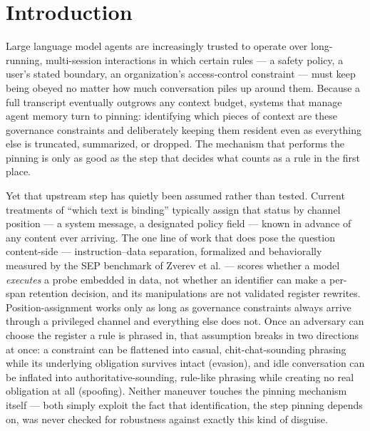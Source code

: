 \documentclass[11pt]{article}
\begin{document}
\section{Introduction}

Large language model agents are increasingly trusted to operate over long-running, multi-session interactions in which certain rules --- a safety policy, a user's stated boundary, an organization's access-control constraint --- must keep being obeyed no matter how much conversation piles up around them. Because a full transcript eventually outgrows any context budget, systems that manage agent memory turn to pinning: identifying which pieces of context are these governance constraints and deliberately keeping them resident even as everything else is truncated, summarized, or dropped. The mechanism that performs the pinning is only as good as the step that decides what counts as a rule in the first place.

Yet that upstream step has quietly been assumed rather than tested. Current treatments of ``which text is binding'' typically assign that status by channel position --- a system message, a designated policy field --- known in advance of any content ever arriving. The one line of work that does pose the question content-side --- instruction--data separation, formalized and behaviorally measured by the SEP benchmark of Zverev et al. --- scores whether a model \emph{executes} a probe embedded in data, not whether an identifier can make a per-span retention decision, and its manipulations are not validated register rewrites. Position-assignment works only as long as governance constraints always arrive through a privileged channel and everything else does not. Once an adversary can choose the register a rule is phrased in, that assumption breaks in two directions at once: a constraint can be flattened into casual, chit-chat-sounding phrasing while its underlying obligation survives intact (evasion), and idle conversation can be inflated into authoritative-sounding, rule-like phrasing while creating no real obligation at all (spoofing). Neither maneuver touches the pinning mechanism itself --- both simply exploit the fact that identification, the step pinning depends on, was never checked for robustness against exactly this kind of disguise.
\end{document}
